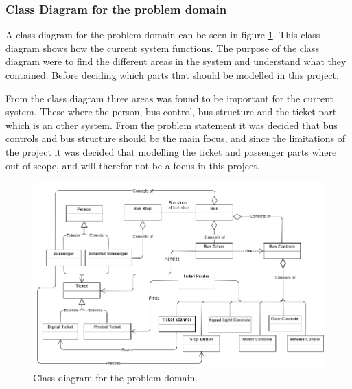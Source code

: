 \subsubsection{Class Diagram for the problem domain}
A class diagram for the problem domain can be seen in figure \ref{problem-domain-class-diagram}. This class diagram shows how the current system functions. The purpose of the class diagram were to find the different areas in the system and understand what they contained. Before deciding which parts that should be modelled in this project.

From the class diagram three areas was found to be important for the current system. These where the person, bus control, bus structure and the ticket part which is an other system. From the problem statement it was decided that bus controls and bus structure should be the main focus, and since the limitations of the project it was decided that modelling the ticket and passenger parts where out of scope, and will therefor not be a focus in this project. 


\begin{figure}[H]
\centering
\includegraphics[scale=0.49]{Images/problem_domain_class_diagram.png}
\caption{Class diagram for the problem domain.}
\label{problem-domain-class-diagram}
\end{figure}


